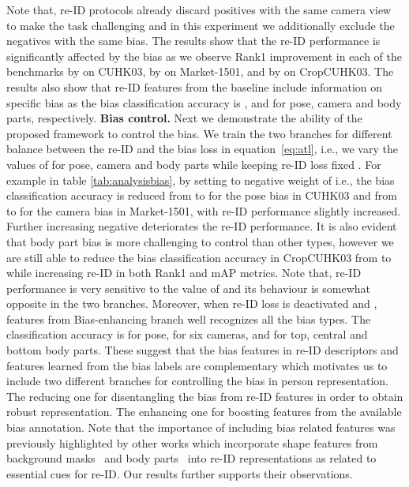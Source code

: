 \documentclass[10pt,twocolumn,letterpaper]{article}
\begin{document}
Note that, re-ID protocols already discard positives with the same camera view to make the task challenging and in this experiment we additionally exclude the negatives with the same bias. The results show that the re-ID performance  is significantly affected by the bias as we observe Rank1 improvement in each of the benchmarks by  on CUHK03, by  on Market-1501, and  by  on CropCUHK03. 
The results also show that re-ID features from the baseline include information on specific bias as the bias classification accuracy is ,  and  for pose, camera and body parts, respectively. 
\newline
\noindent\textbf{Bias control.} Next we demonstrate the ability of the proposed framework to control the bias.  We train the two branches for different balance between the re-ID and the bias loss in equation~\ref{eq:atl}, i.e., we vary the values of  for pose, camera and body parts while keeping re-ID loss fixed .
For example in table \ref{tab:analysisbias}, by setting   to  negative weight of  i.e.,  the bias classification accuracy is  reduced from  to  for the pose bias in CUHK03  and from  to  for the camera bias in Market-1501, with re-ID performance slightly increased. Further increasing negative   deteriorates the re-ID performance. It is also evident that body part bias is more challenging to control than other types, however we are still able to reduce the bias classification accuracy in CropCUHK03 from  to  while increasing re-ID in both Rank1 and mAP metrics. 
{ Note that, re-ID performance is very sensitive to the value of  and its behaviour is somewhat opposite in the two branches.
Moreover, when re-ID loss  is deactivated and , features from Bias-enhancing branch well recognizes all the bias types. The classification accuracy is  for pose,  for six cameras, and  for top, central and bottom body parts.  
These suggest that the bias features in re-ID descriptors and features learned from the bias labels are complementary which motivates us to include two different branches for controlling the bias in person representation.
The reducing one for disentangling the bias from re-ID features in order to obtain robust representation. The enhancing one for boosting features from the available bias annotation. Note that the importance of including bias related features was previously highlighted by other works which incorporate shape features from background masks~\cite{su2017pose} and body parts~\cite{song2018mask} into re-ID representations as related to essential cues for re-ID.
}
Our results further supports their observations.
\end{document}
